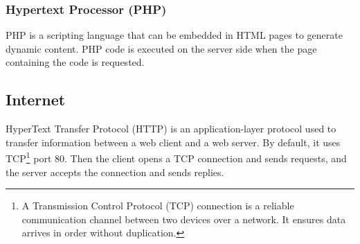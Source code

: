 \subsubsection{Hypertext Processor (PHP)}
PHP is a scripting language that can be embedded in HTML pages to generate dynamic content. PHP code is executed on the server side when the page containing the code is requested.

\subsection{Internet}
HyperText Transfer Protocol (HTTP) is an application-layer protocol used to transfer information between a web client and a web server. By default, it uses TCP\footnote{A Transmission Control Protocol (TCP) connection is a reliable communication channel between two devices over a network. It ensures data arrives in order without duplication.} port 80. Then the client opens a TCP connection and sends requests, and the server accepts the connection and sends replies. 

